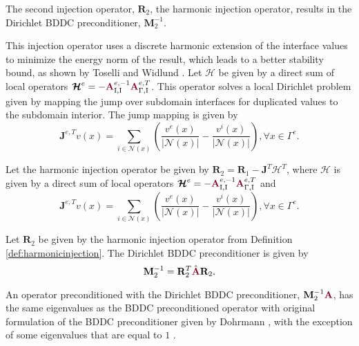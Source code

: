 The second injection operator, $\mathbf{R}_2$, the harmonic injection operator, results in the Dirichlet BDDC preconditioner, $\mathbf{M}^{-1}_2$.

This injection operator uses a discrete harmonic extension of the interface values to minimize the energy norm of the result, which leads to a better stability bound, as shown by Toselli and Widlund \cite{toselli2006domain}.
Let $\boldsymbol{\mathcal{H}}$ be given by a direct sum of local operators $\boldsymbol{\mathcal{H}}^e = - {\color{burgundy}\mathbf{A}}_{\text{I}, \text{I}}^{e, -1} {\color{burgundy}\mathbf{A}}_{\Gamma, \text{I}}^{e, T}$.
This operator solves a local Dirichlet problem given by mapping the jump over subdomain interfaces for duplicated values to the subdomain interior.
The jump mapping is given by
\begin{equation}
\mathbf{J}^{e, T} v \left( x \right) = \sum_{i \in \mathcal{N} \left( x \right)} \left( \frac{v^e \left( x \right)}{\lvert \mathcal{N} \left( x \right) \rvert} - \frac{v^i \left( x \right)}{\lvert \mathcal{N} \left( x \right) \rvert} \right), \forall x \in \Gamma^e.
\end{equation}

\begin{definition}
Let the harmonic injection operator be given by $\mathbf{R}_2 = \mathbf{R}_1 - \mathbf{J}^T \boldsymbol{\mathcal{H}}^T$, where $\boldsymbol{\mathcal{H}}$ is given by a direct sum of local operators $\boldsymbol{\mathcal{H}}^e = - {\color{burgundy}\mathbf{A}}_{\text{I}, \text{I}}^{e, -1} {\color{burgundy}\mathbf{A}}_{\Gamma, \text{I}}^{e, T}$ and
\begin{equation}
\mathbf{J}^{e, T} v \left( x \right) = \sum_{i \in \mathcal{N} \left( x \right)} \left( \frac{v^e \left( x \right)}{\lvert \mathcal{N} \left( x \right) \rvert} - \frac{v^i \left( x \right)}{\lvert \mathcal{N} \left( x \right) \rvert} \right), \forall x \in \Gamma^e.
\end{equation}
\label{def:harmonicinjection}
\end{definition}

\begin{definition}
Let $\mathbf{R}_2$ be given by the harmonic injection operator from Definition \ref{def:harmonicinjection}.
The Dirichlet BDDC preconditioner is given by 
\begin{equation}
\mathbf{M}^{-1}_2 = \mathbf{R}_2^T \hat{\color{burgundy}\mathbf{A}} \mathbf{R}_2.
\end{equation}
\label{def:dirichletbddc}
\end{definition}

An operator preconditioned with the Dirichlet BDDC preconditioner, $\mathbf{M}^{-1}_2 {\color{burgundy}\mathbf{A}}$, has the same eigenvalues as the BDDC preconditioned operator with original formulation of the BDDC preconditioner given by Dohrmann \cite{dohrmann2003preconditioner}, with the exception of some eigenvalues that are equal to $1$ \cite{li2007use}.
